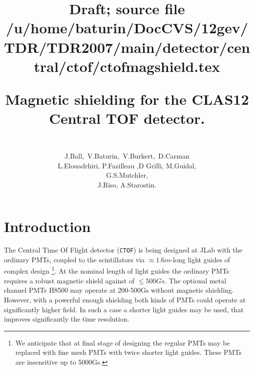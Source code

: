 \documentclass[12pt]{article}
\begin{document}
\pagestyle{plain}
%
%
%
%
%
\title
{
\vspace{-1.4cm}
\begin{flushright}
\normalsize{Draft; source file /u/home/baturin/DocCVS/12gev/TDR/TDR2007/main/detector/central/ctof/ctofmagshield.tex}
\nopagebreak
\end{flushright}Magnetic shielding for the CLAS12 Central TOF detector.}
\author
{
{}\\
\mbox
{J.Ball, V.Baturin, V.Burkert, D.Carman} \\
{ L.Elouadrhiri, P.Fazilleau ,D Grilli, M.Guidal,} \\
{G.S.Mutchler,} \\
{J.Riso,  A.Starostin. }
\mbox 
{}\\
}
\maketitle  
\tableofcontents
\listoftables
\newpage
\section{Introduction}
 
The Central Time Of Flight detector ({\tt CTOF}) 
 is being designed at JLab with the  ordinary PMTs, coupled 
to the scintillators via $\approx1.6m$-long light guides of complex design
\footnote{We  anticipate that  at
final stage of designing   the regular PMTs may be replaced
with fine mesh PMTs with twice shorter light guides. These PMTs
 are insensitive  up to 5000Gs.}.
 At the nominal length of light guides the
 ordinary  PMTs  requires a robust magnetic shield against  of $\leq500Gs$.
The   optional metal channel PMTs H8500  may operate at 200-500Gs  without magnetic shielding.
However, with a powerful enough  shielding both kinds of PMTs could operate at significantly 
higher field. In such a case a  shorter light guides may  be used, 
 that improves  significantly the  time resolution.
\end{document}
